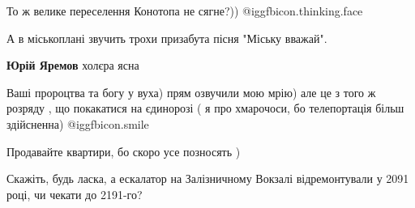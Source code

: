 \begin{itemize}
То ж велике переселення Конотопа не сягне?)) @igg{fbicon.thinking.face} 

 
А в міськоплані звучить трохи призабута пісня "Міську вважай".

\begin{itemize}
 
\textbf{Юрій Яремов} холєра ясна
\end{itemize}

 

Ваші пророцтва та богу у вуха) прям озвучили мою мрію) але це з того ж розряду
, що покакатися на єдинорозі ( я про хмарочоси, бо телепортація більш
здійсненна)  @igg{fbicon.smile} 


 
Продавайте квартири, бо скоро усе позносять )

 
Скажіть, будь ласка, а ескалатор на Залізничному Вокзалі відремонтували у 2091 році, чи чекати до 2191-го?

\begin{itemize}
 

\end{itemize}
\end{itemize}

